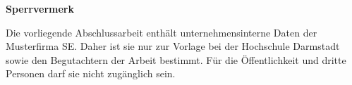 \thispagestyle{empty}


\vspace*{\fill}

\begin{center}
  \begin{Large}
    \textbf{Sperrvermerk}
  \end{Large}
\end{center}

\vspace{0.5cm}

\noindent %
\glqq Die vorliegende Abschlussarbeit enthält unternehmensinterne Daten der Musterfirma SE. Daher ist sie nur zur Vorlage bei der Hochschule Darmstadt sowie den Begutachtern der Arbeit bestimmt. Für die Öffentlichkeit und dritte Personen darf sie nicht zugänglich sein.\grqq{}

\vspace*{\fill}
 
\restoregeometry